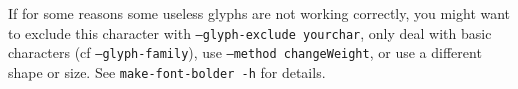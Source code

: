 \documentclass[11pt]{article}
\begin{document}
\medskip

If for some reasons some useless glyphs are not working correctly, you might want to exclude this character with \texttt{--glyph-exclude yourchar}, only deal with basic characters (cf \texttt{--glyph-family}), use \texttt{--method changeWeight}, or use a different shape or size. See \texttt{make-font-bolder -h} for details.
\end{document}
